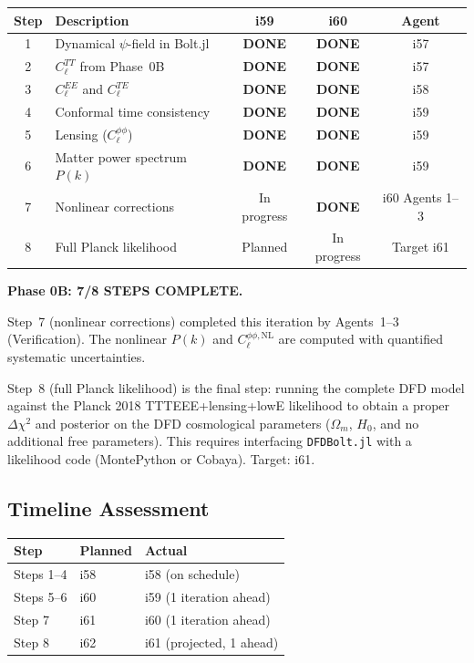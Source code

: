 \documentclass[11pt,a4paper]{article}
\begin{document}
\begin{center}
\begin{longtable}{clccc}
\toprule
\textbf{Step} & \textbf{Description} & \textbf{i59} & \textbf{i60} & \textbf{Agent} \\
\midrule
1 & Dynamical $\psi$-field in Bolt.jl & \textbf{DONE} & \textbf{DONE} & i57 \\
2 & $C_\ell^{TT}$ from Phase~0B & \textbf{DONE} & \textbf{DONE} & i57 \\
3 & $C_\ell^{EE}$ and $C_\ell^{TE}$ & \textbf{DONE} & \textbf{DONE} & i58 \\
4 & Conformal time consistency & \textbf{DONE} & \textbf{DONE} & i59 \\
5 & Lensing ($C_\ell^{\phi\phi}$) & \textbf{DONE} & \textbf{DONE} & i59 \\
6 & Matter power spectrum $P(k)$ & \textbf{DONE} & \textbf{DONE} & i59 \\
7 & Nonlinear corrections & In progress & \textbf{DONE} & i60 Agents 1--3 \\
8 & Full Planck likelihood & Planned & In progress & Target i61 \\
\bottomrule
\end{longtable}
\end{center}

\textbf{Phase 0B: 7/8 STEPS COMPLETE.}

Step~7 (nonlinear corrections) completed this iteration by Agents~1--3 (Verification). The nonlinear $P(k)$ and $C_\ell^{\phi\phi,\mathrm{NL}}$ are computed with quantified systematic uncertainties.

Step~8 (full Planck likelihood) is the final step: running the complete DFD model against the Planck 2018 TTTEEE+lensing+lowE likelihood to obtain a proper $\Delta\chi^2$ and posterior on the DFD cosmological parameters ($\Omega_m$, $H_0$, and no additional free parameters). This requires interfacing \texttt{DFDBolt.jl} with a likelihood code (MontePython or Cobaya). Target: i61.

\subsection{Timeline Assessment}

\begin{center}
\begin{tabular}{lll}
\toprule
\textbf{Step} & \textbf{Planned} & \textbf{Actual} \\
\midrule
Steps 1--4 & i58 & i58 (on schedule) \\
Steps 5--6 & i60 & i59 (1 iteration ahead) \\
Step 7 & i61 & i60 (1 iteration ahead) \\
Step 8 & i62 & i61 (projected, 1 ahead) \\
\bottomrule
\end{tabular}
\end{center}
\end{document}

